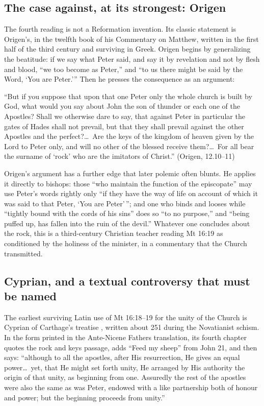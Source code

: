 \subsection{The case against, at its strongest: Origen}

The fourth reading is not a Reformation invention. Its classic statement is
Origen's, in the twelfth book of his Commentary on Matthew, written in the
first half of the third century and surviving in Greek. Origen begins by
generalizing the beatitude: if we say what Peter said, and say it by
revelation and not by flesh and blood, ``we too become as Peter,'' and ``to
us there might be said by the Word, `You are Peter.''' Then he presses the
consequence as an argument:

\begin{studyframe}\small
``But if you suppose that upon that one Peter only the whole church is built
by God, what would you say about John the son of thunder or each one of the
Apostles? Shall we otherwise dare to say, that against Peter in particular
the gates of Hades shall not prevail, but that they shall prevail against the
other Apostles and the perfect?\ldots\ Are the keys of the kingdom of heaven
given by the Lord to Peter only, and will no other of the blessed receive
them?\ldots\ For all bear the surname of `rock' who are the imitators of
Christ.'' (Origen,  12.10--11)
\end{studyframe}

Origen's argument has a further edge that later polemic often blunts. He
applies it directly to bishops: those ``who maintain the function of the
episcopate'' may use Peter's words rightly only ``if they have the way of
life on account of which it was said to that Peter, `You are Peter'\,''; and
one who binds and looses while ``tightly bound with the cords of his sins''
does so ``to no purpose,'' and ``being puffed up, has fallen into the ruin of
the devil.'' Whatever one concludes about the rock, this is a third-century
Christian teacher reading Mt 16:19 as conditioned by the holiness of the
minister, in a commentary that the Church transmitted.

\subsection{Cyprian, and a textual controversy that must be named}

The earliest surviving Latin use of Mt 16:18--19 for the unity of the Church
is Cyprian of Carthage's treatise ,
written about 251 during the Novatianist schism. In the form printed in the
Ante-Nicene Fathers translation, its fourth chapter quotes the rock and keys
passage, adds ``Feed my sheep'' from John 21, and then says: ``although to
all the apostles, after His resurrection, He gives an equal power\ldots\ yet,
that He might set forth unity, He arranged by His authority the origin of
that unity, as beginning from one. Assuredly the rest of the apostles were
also the same as was Peter, endowed with a like partnership both of honour
and power; but the beginning proceeds from unity.''

